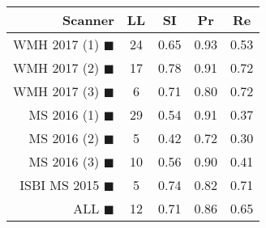 \begin{tabular}{rcccc}
\toprule
Scanner & LL & SI & Pr & Re \\
\midrule
WMH 2017 (1) {\color[rgb]{ 1.00 0.00 0.00}$\blacksquare$} & 24 & 0.65 & 0.93 & 0.53 \\
WMH 2017 (2) {\color[rgb]{ 1.00 0.50 0.00}$\blacksquare$} & 17 & 0.78 & 0.91 & 0.72 \\
WMH 2017 (3) {\color[rgb]{ 1.00 0.80 0.00}$\blacksquare$} & 6 & 0.71 & 0.80 & 0.72 \\
MS  2016 (1) {\color[rgb]{ 0.20 0.80 0.00}$\blacksquare$} & 29 & 0.54 & 0.91 & 0.37 \\
MS  2016 (2) {\color[rgb]{ 0.00 0.40 1.00}$\blacksquare$} & 5 & 0.42 & 0.72 & 0.30 \\
MS  2016 (3) {\color[rgb]{ 0.60 0.00 1.00}$\blacksquare$} & 10 & 0.56 & 0.90 & 0.41 \\
ISBI MS 2015 {\color[rgb]{ 1.00 0.00 1.00}$\blacksquare$} & 5 & 0.74 & 0.82 & 0.71 \\
\midrule
ALL {\color[rgb]{ 1.00 1.00 1.00}$\blacksquare$} & 12 & 0.71 & 0.86 & 0.65 \\
\bottomrule
\end{tabular}